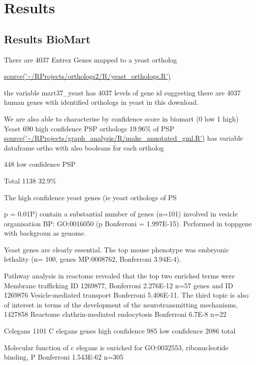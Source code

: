 




\section{Results}
\subsection{Results BioMart}
There are 4037 Entrez Genes mapped to a yeast ortholog

\url{source('~/RProjects/orthologs2/R/yeast_orthologs.R')} 


the variable mart37\_yeast has 4037 levels of gene id suggesting there are 4037 human genes with identified orthologs in yeast in this download.

We are also able to characterise by confidence score in biomart (0 low 1 high)
Yeast
690 high confidence PSP orthologs 19.96\% of PSP
\url{source('~/RProjects/graph_analysis/R/make_annotated_gml.R')} has variable dataframe ortho with also booleans for each ortholog

448 low confidence PSP 

Total 1138 32.9\%

The high confidence yeast genes (ie yeast orthologs of PS

p = 0.01P) contain a substantial number of genes (n=101) involved in vesicle organisation BP: GO:0016050 (p Bonferroni = 1.997E-15). Performed in toppgene with backgroun as genome. 

Yeast genes are clearly essential. The top mouse phenotype was embryonic lethality (n= 100, genes MP:0008762, Bonferroni 3.94E-4).

Pathway analysis in reactome revealed that the top two enriched terms were Membrane trafficking ID 1269877, Bonferroni 2.276E-12 n=57 genes and ID 1269876 Vesicle-mediated transport Bonferroni 5.406E-11. The third topic is also of interest in terms of the development of the neurotransmitting mechanisms, 1427858 Reactome clathrin-mediated endocytosis Bonferroni 6.7E-8 n=22

Celegans
1101 C elegans genes high confidence
985 low confidence
2086 total

Molecular function of c elegans is enriched for GO:0032553, ribonucleotide binding, P Bonferroni 1.543E-62 n=305

